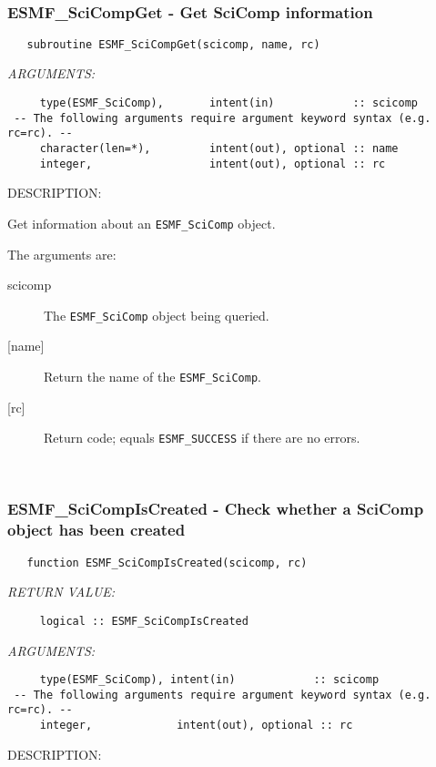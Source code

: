 \mbox{}\hrulefill\ 
 
\subsubsection [ESMF\_SciCompGet] {ESMF\_SciCompGet - Get SciComp information}


  
\begin{verbatim}   subroutine ESMF_SciCompGet(scicomp, name, rc)\end{verbatim}{\em ARGUMENTS:}
\begin{verbatim}     type(ESMF_SciComp),       intent(in)            :: scicomp
 -- The following arguments require argument keyword syntax (e.g. rc=rc). --
     character(len=*),         intent(out), optional :: name
     integer,                  intent(out), optional :: rc\end{verbatim}
{\sf DESCRIPTION:\\ }


   Get information about an {\tt ESMF\_SciComp} object.
    
   The arguments are:
   \begin{description}
   \item[scicomp]
     The {\tt ESMF\_SciComp} object being queried.
   \item[{[name]}]
     Return the name of the {\tt ESMF\_SciComp}.
   \item[{[rc]}]
     Return code; equals {\tt ESMF\_SUCCESS} if there are no errors.
   \end{description}
   
 
\mbox{}\hrulefill\ 
 
\subsubsection [ESMF\_SciCompIsCreated] {ESMF\_SciCompIsCreated - Check whether a SciComp object has been created}


 
\begin{verbatim}   function ESMF_SciCompIsCreated(scicomp, rc)\end{verbatim}{\em RETURN VALUE:}
\begin{verbatim}     logical :: ESMF_SciCompIsCreated\end{verbatim}{\em ARGUMENTS:}
\begin{verbatim}     type(ESMF_SciComp), intent(in)            :: scicomp
 -- The following arguments require argument keyword syntax (e.g. rc=rc). --
     integer,             intent(out), optional :: rc
 \end{verbatim}
{\sf DESCRIPTION:\\ }


